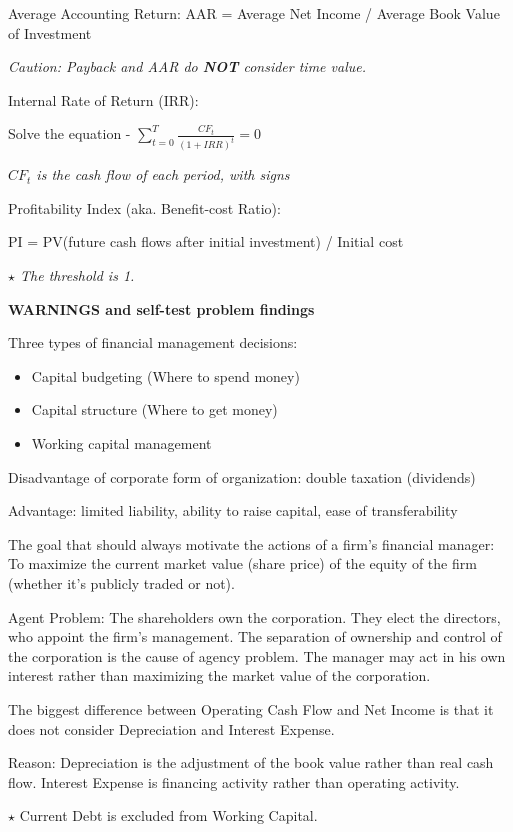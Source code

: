 \documentclass{article}
\newcommand{\bigtitle}[1]{
	\noindent
	\textbf{#1}
}
\begin{document}
Average Accounting Return: AAR = Average Net Income / Average Book Value of Investment

\textit{Caution: Payback and AAR do \textbf{NOT} consider time value.}

Internal Rate of Return (IRR): 

Solve the equation -  $\sum_{t=0}^{T}\frac{CF_t}{(1+IRR)^t}=0$

\textit{$CF_t$ is the cash flow of each period, with signs}

Profitability Index (aka. Benefit-cost Ratio):

\noindent
PI = PV(future cash flows after initial investment) / Initial cost

\textit{$\star$ The threshold is 1.}




\bigtitle{WARNINGS and self-test problem findings}


Three types of financial management decisions:
	\begin{itemize}
		\item Capital budgeting (Where to spend money)
		\item Capital structure (Where to get money)
		\item Working capital management
	\end{itemize}

Disadvantage of corporate form of organization: double taxation (dividends)
	
Advantage: limited liability, ability to raise capital, ease of transferability
	
The goal that should always motivate the actions of a firm's financial manager: To maximize the current market value (share price) of the equity of the firm (whether it's publicly traded or not).
	
Agent Problem: The shareholders own the corporation. They elect the directors, who appoint the firm's management. The separation of ownership and control of the corporation is the cause of agency problem. The manager may act in his own interest rather than maximizing the market value of the corporation.

The biggest difference between Operating Cash Flow and Net Income is that it does not consider Depreciation and Interest Expense.

Reason: Depreciation is the adjustment of the book value rather than real cash flow. Interest Expense is financing activity rather than operating activity.

$\star$ Current Debt is excluded from Working Capital.
\end{document}
